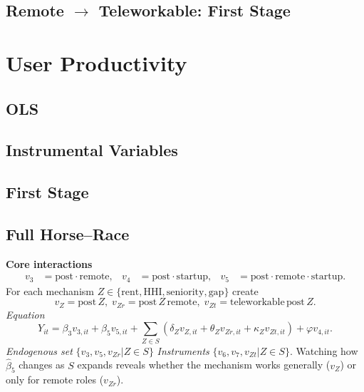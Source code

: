 \documentclass{article}
\newcommand{\cleanedresultsdir}{../results/cleaned}
\begin{document}
\subsection{Remote $\rightarrow$ Teleworkable: First Stage}



\clearpage
\section{User Productivity}
\label{sec:user_productivity}

\subsection{OLS}


\subsection{Instrumental Variables}


\subsection{First Stage}


\clearpage
\begin{landscape}
\subsection*{Full Horse–Race}
\textbf{Core interactions}
\[\begin{aligned}
 v_3 &= \text{post}\cdot\text{remote}, &
 v_4 &= \text{post}\cdot\text{startup}, &
 v_5 &= \text{post}\cdot\text{remote}\cdot\text{startup}. 
\end{aligned}\]
For each mechanism $Z\in\{\text{rent},\text{HHI},\text{seniority},\text{gap}\}$ create
\[v_Z=\text{post}\,Z,\; v_{Zr}=\text{post}\,Z\,\text{remote},\; v_{Zt}=\text{teleworkable}\,\text{post}\,Z.\]
\emph{Equation}
\[Y_{it}=\beta_3 v_{3,it}+\beta_5 v_{5,it}+\sum_{Z\in S}(\delta_Z v_{Z,it}+\theta_Z v_{Zr,it}+\kappa_Z v_{Zt,it})+\varphi v_{4,it}.
\]
\emph{Endogenous set}\; $\{v_3,v_5,v_{Zr}|Z\in S\}$ \quad\emph{Instruments}\; $\{v_6,v_7,v_{Zt}|Z\in S\}$.
Watching how $\widehat\beta_5$ changes as $S$ expands reveals whether the mechanism works generally ($v_Z$) or only for remote roles ($v_{Zr}$).

\end{landscape}
\end{document}

